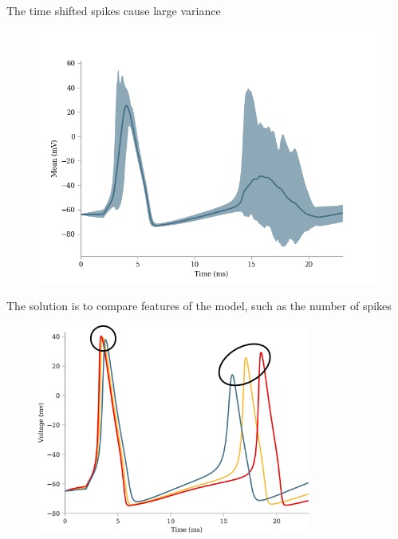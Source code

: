 \documentclass[presentation]{beamer}
\begin{document}


\begin{frame}{The time shifted spikes cause large variance}
  \vspace{-5mm}
  \begin{figure}
    \includegraphics[width=1\textwidth]{hh_prediction.png}
  \end{figure}
  \end{frame}




\begin{frame}{The solution is to compare features of the model,
  such as the number of spikes}
  \vspace{-5mm}
  \begin{figure}
    \includegraphics[width=0.8\textwidth]{features_nrspikes.png}
  \end{figure}
  \end{frame}
\end{document}
